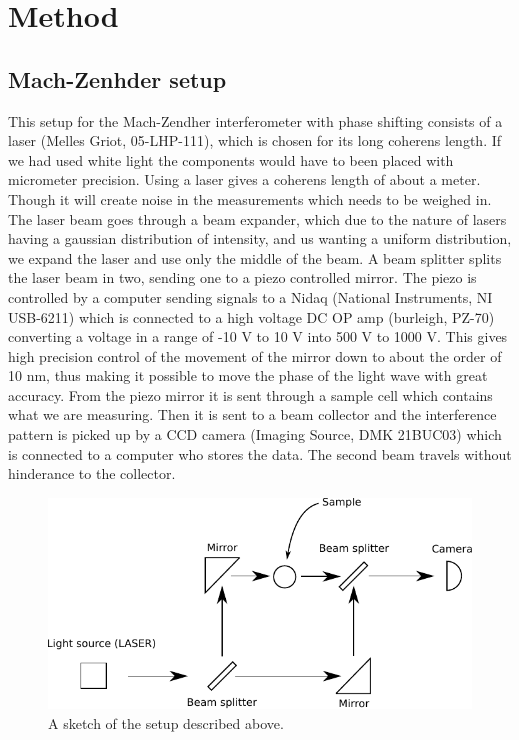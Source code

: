 \section {Method}

\subsection {Mach-Zenhder setup}
This setup for the Mach-Zendher interferometer with phase shifting consists of
a laser (Melles Griot, 05-LHP-111), which is chosen for its long coherens length. 
If we had used white light the components would have to been placed with micrometer 
precision. Using a laser gives a coherens length of about a meter. Though it will 
create noise in the measurements which needs to be weighed in.
The laser beam goes through a beam expander, which due to the nature of lasers having 
a gaussian distribution of intensity, and us wanting a uniform distribution, 
we expand the laser and use only the middle of the beam.
A beam splitter splits the laser beam in two, sending one to a piezo controlled
mirror. 
The piezo is controlled by a computer sending signals to a Nidaq 
(National Instruments, NI USB-6211) which is connected to a high voltage DC OP amp
(burleigh, PZ-70) converting a voltage in a range of -10 V to 10 V 
into 500 V to 1000 V. This gives high precision control of the movement of the 
mirror down to about the order of 10 nm, thus making it possible to move the 
phase of the light wave with great accuracy. From the piezo mirror it is sent 
through a sample cell which contains what we are measuring.
Then it is sent to a beam collector and the interference pattern is picked up by
a CCD camera (Imaging Source, DMK 21BUC03) which is connected to a computer who stores the data.
The second beam travels without hinderance to the collector.
\begin {figure}[ht!]
\includegraphics [width=15cm]{bilder/MZ.pdf}
\caption {A sketch of the setup described above.}
\end {figure}
